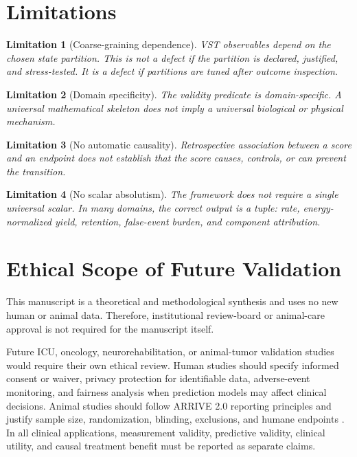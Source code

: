 \documentclass[11pt,a4paper]{article}
\newtheorem{limitation}{Limitation}
\newcommand{\1}{\mathbf{1}}
\begin{document}
\section{Limitations}

\begin{limitation}[Coarse-graining dependence]
VST observables depend on the chosen state partition. This is not a defect if the partition is declared, justified, and stress-tested. It is a defect if partitions are tuned after outcome inspection.
\end{limitation}

\begin{limitation}[Domain specificity]
The validity predicate is domain-specific. A universal mathematical skeleton does not imply a universal biological or physical mechanism.
\end{limitation}

\begin{limitation}[No automatic causality]
Retrospective association between a score and an endpoint does not establish that the score causes, controls, or can prevent the transition.
\end{limitation}

\begin{limitation}[No scalar absolutism]
The framework does not require a single universal scalar. In many domains, the correct output is a tuple: rate, energy-normalized yield, retention, false-event burden, and component attribution.
\end{limitation}

\section{Ethical Scope of Future Validation}

This manuscript is a theoretical and methodological synthesis and uses no new human or animal data. Therefore, institutional review-board or animal-care approval is not required for the manuscript itself.

Future ICU, oncology, neurorehabilitation, or animal-tumor validation studies would require their own ethical review. Human studies should specify informed consent or waiver, privacy protection for identifiable data, adverse-event monitoring, and fairness analysis when prediction models may affect clinical decisions. Animal studies should follow ARRIVE 2.0 reporting principles and justify sample size, randomization, blinding, exclusions, and humane endpoints \cite{arrive2020}. In all clinical applications, measurement validity, predictive validity, clinical utility, and causal treatment benefit must be reported as separate claims.
\end{document}
